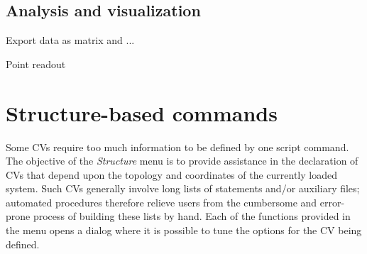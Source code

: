 \documentclass[preprint,12pt]{elsarticle}
\begin{document}
\subsection{Analysis and visualization}

Export data as matrix and ...

Point readout




\section{Structure-based commands}


Some CVs require too much information to be defined by one script command.
The objective of the \emph{Structure} menu is to provide assistance in the declaration of CVs
that depend upon the topology and coordinates of the currently loaded
system. Such CVs generally involve long lists of statements and/or
auxiliary files; automated procedures therefore relieve users
from the cumbersome and error-prone process of building these lists by
hand. Each of the functions provided in the menu opens a dialog where
it is possible to tune the options for the CV being defined.
\end{document}
